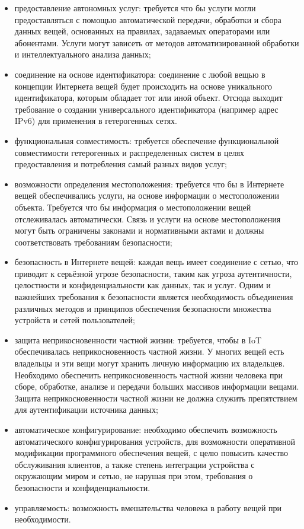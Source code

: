 \begin{itemize}
	\item предоставление автономных услуг: требуется что бы услуги могли предоставляться с помощью автоматической передачи, обработки и сбора данных вещей, основанных на правилах, задаваемых операторами или абонентами. Услуги могут зависеть от методов автоматизированной обработки и интеллектуального анализа данных;
	\item соединение на основе идентификатора: соединение с любой вещью в концепции Интернета вещей будет происходить на основе уникального идентификатора, которым обладает тот или иной объект. Отсюда выходит требование о создании универсального идентификатора (например адрес IPv6) для применения в гетерогенных сетях.
	\item функциональная совместимость: требуется обеспечение функциональной совместимости гетерогенных и распределенных систем в целях предоставления и потребления самый разных видов услуг;
	\item  возможности определения местоположения: требуется что бы в Интернете вещей обеспечивались услуги, на основе информации о местоположении объекта. Требуется что бы информация о местоположении вещей отслеживалась автоматически. Связь и услуги на основе местоположения могут быть ограничены законами и нормативными актами и должны соответствовать требованиям безопасности;
	\item безопасность в Интернете вещей: каждая вещь имеет соединение с сетью, что приводит к серьёзной угрозе безопасности, таким как угроза аутентичности, целостности и конфиденциальности как данных, так и услуг. Одним и важнейших требования к безопасности является необходимость объединения различных методов и принципов обеспечения безопасности множества устройств и сетей пользователей;
	\item защита неприкосновенности частной жизни: требуется, чтобы в IoT обеспечивалась неприкосновенность частной жизни. У многих вещей есть владельцы и эти вещи могут хранить личную информацию их владельцев. Необходимо обеспечить неприкосновенность частной жизни человека при сборе, обработке, анализе и передачи больших массивов информации вещами. Защита неприкосновенности частной жизни не должна служить препятствием для аутентификации источника данных;
	\item автоматическое конфигурирование: необходимо обеспечить возможность автоматического конфигурирования устройств, для возможности оперативной модификации программного обеспечения вещей, с целю повысить качество обслуживания клиентов, а также степень интеграции устройства с окружающим миром и сетью, не нарушая при этом, требования о безопасности и конфиденциальности.
	\item управляемость: возможность вмешательства человека в работу вещей при необходимости.
\end{itemize}

